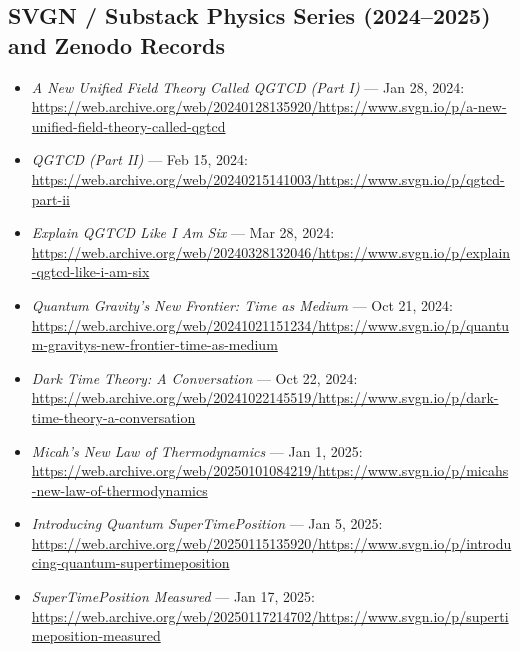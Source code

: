 \subsection{SVGN / Substack Physics Series (2024--2025) and Zenodo Records}
\begin{itemize}
  \item \emph{A New Unified Field Theory Called QGTCD (Part I)} --- Jan 28, 2024: \url{https://web.archive.org/web/20240128135920/https://www.svgn.io/p/a-new-unified-field-theory-called-qgtcd}
  \item \emph{QGTCD (Part II)} --- Feb 15, 2024: \url{https://web.archive.org/web/20240215141003/https://www.svgn.io/p/qgtcd-part-ii}
  \item \emph{Explain QGTCD Like I Am Six} --- Mar 28, 2024: \url{https://web.archive.org/web/20240328132046/https://www.svgn.io/p/explain-qgtcd-like-i-am-six}
  \item \emph{Quantum Gravity's New Frontier: Time as Medium} --- Oct 21, 2024: \url{https://web.archive.org/web/20241021151234/https://www.svgn.io/p/quantum-gravitys-new-frontier-time-as-medium}
  \item \emph{Dark Time Theory: A Conversation} --- Oct 22, 2024: \url{https://web.archive.org/web/20241022145519/https://www.svgn.io/p/dark-time-theory-a-conversation}
  \item \emph{Micah's New Law of Thermodynamics} --- Jan 1, 2025: \url{https://web.archive.org/web/20250101084219/https://www.svgn.io/p/micahs-new-law-of-thermodynamics}
  \item \emph{Introducing Quantum SuperTimePosition} --- Jan 5, 2025: \url{https://web.archive.org/web/20250115135920/https://www.svgn.io/p/introducing-quantum-supertimeposition}
  \item \emph{SuperTimePosition Measured} --- Jan 17, 2025: \url{https://web.archive.org/web/20250117214702/https://www.svgn.io/p/supertimeposition-measured}
\end{itemize}

